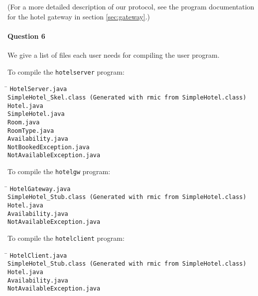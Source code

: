 \documentclass[a4paper,10pt]{article}
\begin{document}
(For a more detailed description of our protocol, see the program
documentation for the hotel gateway in section \ref{sec:gateway}.) %

\paragraph{Question 6}
We give a list of files each user needs for compiling the user
program.

To compile the \texttt{hotelserver} program:
\begin{tabbing}
\hspace{20pt}\=\kill
 \> \texttt{HotelServer.java} \\
 \> \texttt{SimpleHotel\_Skel.class \textrm{(Generated with \texttt{rmic} from \texttt{SimpleHotel.class})}} \\
 \> \texttt{Hotel.java} \\
 \> \texttt{SimpleHotel.java} \\
 \> \texttt{Room.java} \\
 \> \texttt{RoomType.java} \\
 \> \texttt{Availability.java} \\
 \> \texttt{NotBookedException.java} \\
 \> \texttt{NotAvailableException.java}
\end{tabbing}

To compile the \texttt{hotelgw} program:
\begin{tabbing}
\hspace{20pt}\=\kill
 \> \texttt{HotelGateway.java} \\
 \> \texttt{SimpleHotel\_Stub.class \textrm{(Generated with \texttt{rmic} from \texttt{SimpleHotel.class})}} \\
 \> \texttt{Hotel.java} \\
 \> \texttt{Availability.java} \\
 \> \texttt{NotAvailableException.java}
\end{tabbing}

To compile the \texttt{hotelclient} program:
\begin{tabbing}
\hspace{20pt}\=\kill
 \> \texttt{HotelClient.java} \\
 \> \texttt{SimpleHotel\_Stub.class \textrm{(Generated with \texttt{rmic} from \texttt{SimpleHotel.class})}} \\
 \> \texttt{Hotel.java} \\
 \> \texttt{Availability.java} \\
 \> \texttt{NotAvailableException.java}
\end{tabbing}
\end{document}

